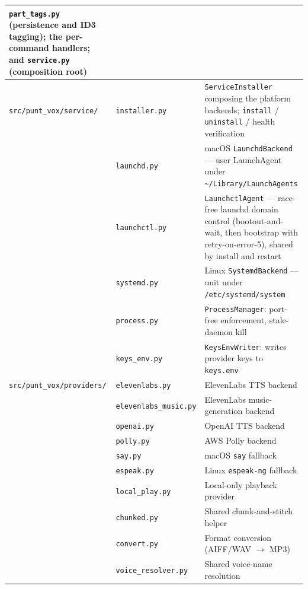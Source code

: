 \documentclass[a4paper,10pt]{article}
\newcommand{\modpath}[1]{\texttt{src/punt\_vox/#1}}
\begin{document}
\begin{center}
\begin{longtable}{llp{7cm}}
             \texttt{part\_tags.py} (persistence and ID3 tagging); the
             per-command handlers; and \texttt{service.py} (composition
             root) \\
\midrule
\modpath{service/} & \texttt{installer.py} & \texttt{ServiceInstaller}
             composing the platform backends; \texttt{install} /
             \texttt{uninstall} / health verification \\
        & \texttt{launchd.py} & macOS \texttt{LaunchdBackend} ---
             user LaunchAgent under \texttt{\~{}/Library/LaunchAgents} \\
        & \texttt{launchctl.py} & \texttt{LaunchctlAgent} --- race-free
             launchd domain control (bootout-and-wait, then bootstrap with
             retry-on-error-5), shared by install and restart \\
        & \texttt{systemd.py} & Linux \texttt{SystemdBackend} ---
             unit under \texttt{/etc/systemd/system} \\
        & \texttt{process.py} & \texttt{ProcessManager}: port-free
             enforcement, stale-daemon kill \\
        & \texttt{keys\_env.py} & \texttt{KeysEnvWriter}: writes provider
             keys to \texttt{keys.env} \\
\midrule
\modpath{providers/} & \texttt{elevenlabs.py} & ElevenLabs TTS backend \\
        & \texttt{elevenlabs\_music.py} & ElevenLabs music-generation backend \\
        & \texttt{openai.py} & OpenAI TTS backend \\
        & \texttt{polly.py} & AWS Polly backend \\
        & \texttt{say.py} & macOS \texttt{say} fallback \\
        & \texttt{espeak.py} & Linux \texttt{espeak-ng} fallback \\
        & \texttt{local\_play.py} & Local-only playback provider \\
        & \texttt{chunked.py} & Shared chunk-and-stitch helper \\
        & \texttt{convert.py} & Format conversion (AIFF/WAV $\to$ MP3) \\
        & \texttt{voice\_resolver.py} & Shared voice-name resolution \\
\bottomrule
\end{longtable}
\end{center}


\end{document}
